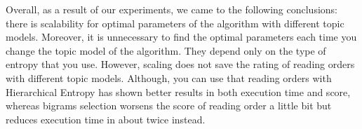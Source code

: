 \documentclass[12pt,twoside]{article}
\begin{document}
	Overall, as a result of our experiments, we came to the following conclusions: there is scalability for optimal parameters of the algorithm with different topic models. Moreover, it is unnecessary to find the optimal parameters each time you change the topic model of the algorithm. They depend only on the type of entropy that you use. However, scaling does not save the rating of reading orders with different topic models. Although, you can use that reading orders with Hierarchical Entropy has shown better results in both execution time and score, whereas bigrams selection worsens the score of reading order a little bit but reduces execution time in about twice instead.
	
	
	
	
	
	
	
	
	
\end{document}
